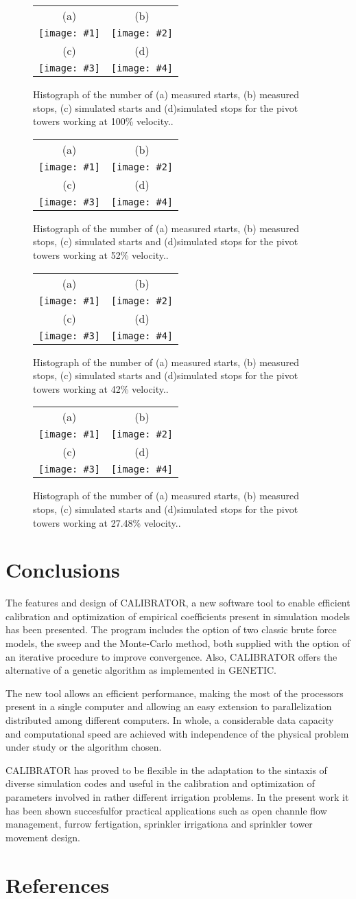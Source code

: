 \documentclass[review,authoryear]{elsarticle}
\newcommand{\FIGIV}[6]
{
	\begin{figure}[ht!]
		\centering
		\begin{tabular}{cc}
			(a) & (b)
			\\ \texttt{[image: \#1]} & \texttt{[image: \#2]}
			\\ (c) & (d)
			\\ \texttt{[image: \#3]} & \texttt{[image: \#4]}
		\end{tabular}
		\caption{#5.\label{#6}}
	\end{figure}
}
\begin{document}
\FIGIV{pivot-measured-starts-100.eps}{pivot-measured-stops-100.eps}
{pivot-simulated-starts-100.eps}{pivot-simulated-stops-100.eps}
{Histograph of the number of (a) measured starts, (b) measured stops, (c)
simulated starts and (d)simulated stops for the pivot towers working at 100\% velocity.}{FigPivot100}

\FIGIV{pivot-measured-starts-52.eps}{pivot-measured-stops-52.eps}
{pivot-simulated-starts-52.eps}{pivot-simulated-stops-52.eps}
{Histograph of the number of (a) measured starts, (b) measured stops, (c)
simulated starts and (d)simulated stops for the pivot towers working at 52\% velocity.}{FigPivot52}

\FIGIV{pivot-measured-starts-42.eps}{pivot-measured-stops-42.eps}
{pivot-simulated-starts-42.eps}{pivot-simulated-stops-42.eps}
{Histograph of the number of (a) measured starts, (b) measured stops, (c)
simulated starts and (d)simulated stops for the pivot towers working at 42\% velocity.}{FigPivot42}

\FIGIV{pivot-measured-starts-27,48.eps}{pivot-measured-stops-27,48.eps}
{pivot-simulated-starts-27,48.eps}{pivot-simulated-stops-27,48.eps}
{Histograph of the number of (a) measured starts, (b) measured stops, (c)
simulated starts and (d)simulated stops for the pivot towers working at 27.48\% velocity.}{FigPivot27}

\section{Conclusions}

The features and design of CALIBRATOR, a new software tool to enable efficient calibration and optimization of empirical coefficients present in simulation models has been presented. The program includes the option of two classic brute force models, the sweep and the Monte-Carlo method, both supplied with the option of an iterative procedure to improve convergence. Also, CALIBRATOR offers the alternative of a genetic algorithm as implemented in GENETIC.

The new tool allows an efficient performance, making the most of the processors present in a single computer and allowing an easy extension to parallelization distributed among different computers. In whole, a considerable data capacity and computational speed are achieved with independence of the physical problem under study or the algorithm chosen.

CALIBRATOR has proved to be flexible in the adaptation to the sintaxis of diverse simulation codes and useful in the calibration and optimization of parameters involved in rather different irrigation problems. In the present work it has been shown succesfulfor practical applications such as open channle flow management, furrow fertigation, sprinkler irrigationa and sprinkler tower movement design.


\section*{References}

\end{document}
